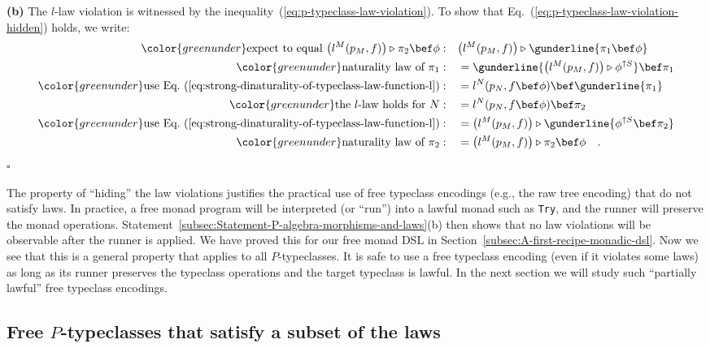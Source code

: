\textbf{(b)} The $l$-law violation is witnessed by the inequality~(\ref{eq:p-typeclass-law-violation}).
To show that Eq.~(\ref{eq:p-typeclass-law-violation-hidden}) holds,
we write:
\begin{align*}
{\color{greenunder}\text{expect to equal }\big(l^{M}(p_{M},f)\big)\triangleright\pi_{2}\bef\phi:}\quad & \big(l^{M}(p_{M},f)\big)\triangleright\gunderline{\pi_{1}\bef\phi}\\
{\color{greenunder}\text{naturality law of }\pi_{1}:}\quad & =\gunderline{\big(l^{M}(p_{M},f)\big)\triangleright\phi^{\uparrow S}}\bef\pi_{1}\\
{\color{greenunder}\text{use Eq.~(\ref{eq:strong-dinaturality-of-typeclass-law-function-l})}:}\quad & =l^{N}(p_{N},f\bef\phi)\bef\gunderline{\pi_{1}}\\
{\color{greenunder}\text{the }l\text{-law holds for }N:}\quad & =l^{N}(p_{N},f\bef\phi)\bef\pi_{2}\\
{\color{greenunder}\text{use Eq.~(\ref{eq:strong-dinaturality-of-typeclass-law-function-l})}:}\quad & =\big(l^{M}(p_{M},f)\big)\triangleright\gunderline{\phi^{\uparrow S}\bef\pi_{2}}\\
{\color{greenunder}\text{naturality law of }\pi_{2}:}\quad & =\big(l^{M}(p_{M},f)\big)\triangleright\pi_{2}\bef\phi\quad.
\end{align*}
$\square$

The property of \textsf{``}hiding\textsf{''} the law violations justifies the practical
use of free typeclass encodings (e.g., the raw tree encoding) that
do not satisfy laws. In practice, a free monad program will be interpreted
(or \textsf{``}run\textsf{''}) into a lawful monad such as \lstinline!Try!,
and the runner will preserve the monad operations. Statement~\ref{subsec:Statement-P-algebra-morphisms-and-laws}(b)
then shows that no law violations will be observable after the runner
is applied. We have proved this for our free monad DSL in Section~\ref{subsec:A-first-recipe-monadic-dsl}.
Now we see that this is a general property that applies to all $P$-typeclasses.
It is safe to use a free typeclass encoding (even if it violates some
laws) as long as its runner preserves the typeclass operations and
the target typeclass is lawful. In the next section we will study
such \textsf{``}partially lawful\textsf{''} free typeclass encodings.

\subsection{Free $P$-typeclasses that satisfy a subset of the laws\label{subsec:Free--typeclasses-that-satisfy-laws}}

